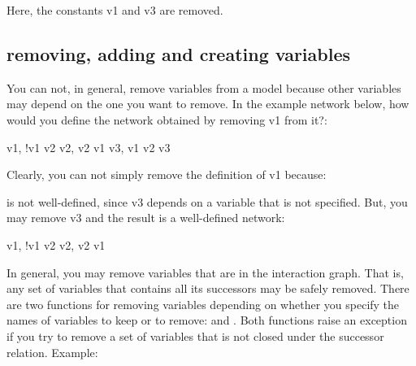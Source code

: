 \documentclass[letterpaper,10pt,english]{sphinxmanual}
\begin{document}
Here, the constants v1 and v3 are removed.


\subsection{removing, adding and creating variables}
\label{\detokenize{Manual:removing-adding-and-creating-variables}}
You can not, in general, remove variables from a model because other variables may depend on the one you want to remove.
In the example network below, how would you define the network obtained by removing v1 from it?:

\begin{sphinxVerbatim}[commandchars=\\\{\}]
v1,   !v1 \textbar{} v2
v2,   v2 \PYGZam{} v1
v3,   v1 \PYGZam{} v2 \PYGZam{} v3
\end{sphinxVerbatim}

Clearly, you can not simply remove the definition of v1 because:

\begin{sphinxVerbatim}[commandchars=\\\{\}]
     
       
\end{sphinxVerbatim}

is not well-defined, since v3 depends on a variable that is not specified.
But, you may remove v3 and the result is a well-defined network:

\begin{sphinxVerbatim}[commandchars=\\\{\}]
v1,   !v1 \textbar{} v2
v2,   v2 \PYGZam{} v1
\end{sphinxVerbatim}

In general, you may remove variables that are  in the interaction graph.
That is, any set of variables that contains all its successors may be safely removed.
There are two functions for removing variables depending on whether you specify the names of variables to keep or to remove:
{\hyperref[\detokenize{PrimeImplicants:remove-variables}]{}} and {\hyperref[\detokenize{PrimeImplicants:remove-all-variables-except}]{}}.
Both functions raise an exception if you try to remove a set of variables that is not closed under the successor relation.
Example:
\end{document}
